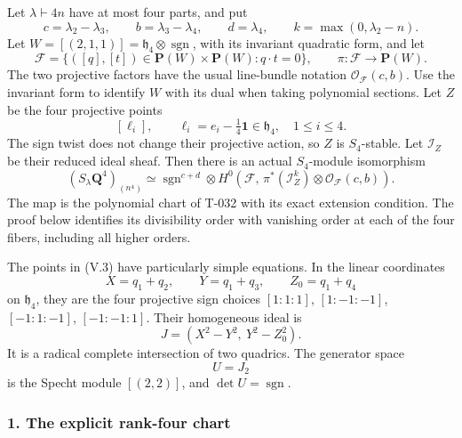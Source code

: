 \documentclass[
  10pt,
]{article}
\begin{document}
Let \(\lambda\vdash4n\) have at most four parts, and put \[
c=\lambda_2-\lambda_3,\qquad
b=\lambda_3-\lambda_4,\qquad
d=\lambda_4,\qquad
k=\max(0,\lambda_2-n).
\tag{V.1}
\] Let \(W=[(2,1,1)]=\mathfrak h_4\otimes\operatorname{sgn}\), with its
invariant quadratic form, and let \[
\mathcal F=\{([q],[t])\in\mathbf P(W)\times\mathbf P(W):q\cdot t=0\},
\qquad \pi:\mathcal F\to\mathbf P(W).
\tag{V.2}
\] The two projective factors have the usual line-bundle notation
\(\mathcal O_{\mathcal F}(c,b)\). Use the invariant form to identify
\(W\) with its dual when taking polynomial sections. Let \(Z\) be the
four projective points \[
[\ell_i],\qquad
\ell_i=e_i-\tfrac14\mathbf1\in\mathfrak h_4,\quad 1\le i\le4.
\tag{V.3}
\] The sign twist does not change their projective action, so \(Z\) is
\(S_4\)-stable. Let \(\mathcal I_Z\) be their reduced ideal sheaf. Then
there is an actual \(S_4\)-module isomorphism \[
\boxed{
(S_\lambda\mathbf Q^4)_{(n^4)}
\simeq
\operatorname{sgn}^{c+d}\otimes
H^0\!\left(\mathcal F,\,
\pi^*(\mathcal I_Z^k)\otimes
\mathcal O_{\mathcal F}(c,b)\right).}
\tag{V.4}
\] The map is the polynomial chart of T-032 with its exact extension
condition. The proof below identifies its divisibility order with
vanishing order at each of the four fibers, including all higher orders.

The points in (V.3) have particularly simple equations. In the linear
coordinates \[
X=q_1+q_2,\qquad Y=q_1+q_3,\qquad Z_0=q_1+q_4
\tag{V.5}
\] on \(\mathfrak h_4\), they are the four projective sign choices
\([1:1:1]\), \([1:-1:-1]\), \([-1:1:-1]\), \([-1:-1:1]\). Their
homogeneous ideal is \[
J=(X^2-Y^2,\ Y^2-Z_0^2).
\tag{V.6}
\] It is a radical complete intersection of two quadrics. The generator
space \[
U=J_2
\tag{V.7}
\] is the Specht module \([(2,2)]\), and \(\det U=\operatorname{sgn}\).

\subsubsection{1. The explicit rank-four
chart}\label{the-explicit-rank-four-chart}
\end{document}
